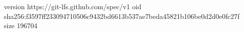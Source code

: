 version https://git-lfs.github.com/spec/v1
oid sha256:f3597ff233094710506c9432bd6613b537ae7beda45821b106be0d2d0e0fc27f
size 196704
